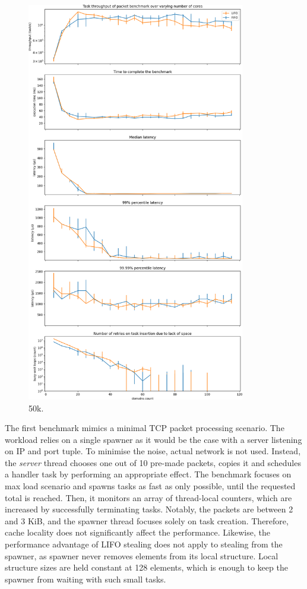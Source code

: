\documentclass[12pt,a4paper,twoside]{report}
\begin{document}
\begin{figure}
     \centering
     \includegraphics[width=0.85\textwidth]{eval/packet-basic-with-steal-counts2std.png}
     \caption{50k.}
    \label{fig:packet-50k}
\end{figure}

The first benchmark mimics a minimal TCP packet processing scenario. The workload relies on a single spawner as it would be the case with a server listening on IP and port tuple. To minimise the noise, actual network is not used. Instead, the \textit{server} thread chooses one out of 10 pre-made packets, copies it and schedules a handler task by performing an appropriate effect. The benchmark focuses on max load scenario and spawns tasks as fast as only possible, until the requested total is reached. Then, it monitors an array of thread-local counters, which are increased by successfully terminating tasks. Notably, the packets are between 2 and 3 KiB, and the spawner thread focuses solely on task creation. Therefore, cache locality does not significantly affect the performance. Likewise, the performance advantage of LIFO stealing does not apply to stealing from the spawner, as spawner never removes elements from its local structure. Local structure sizes are held constant at 128 elements, which is enough to keep the spawner from waiting with such small tasks.
\end{document}
